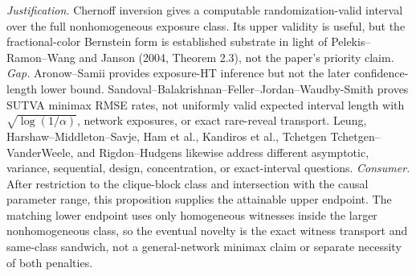 \documentclass{article}
\begin{document}
\par\smallskip\noindent \textit{Justification.} Chernoff inversion gives a computable randomization-valid interval over the full nonhomogeneous exposure class. Its upper validity is useful, but the fractional-color Bernstein form is established substrate in light of Pelekis--Ramon--Wang and Janson (2004, Theorem 2.3), not the paper's priority claim. \textit{Gap.} Aronow--Samii provides exposure-HT inference but not the later confidence-length lower bound. Sandoval--Balakrishnan--Feller--Jordan--Waudby-Smith proves SUTVA minimax RMSE rates, not uniformly valid expected interval length with \(\sqrt{\log(1/\alpha)}\), network exposures, or exact rare-reveal transport. Leung, Harshaw--Middleton--Savje, Ham et al., Kandiros et al., Tchetgen Tchetgen--VanderWeele, and Rigdon--Hudgens likewise address different asymptotic, variance, sequential, design, concentration, or exact-interval questions. \textit{Consumer.} After restriction to the clique-block class and intersection with the causal parameter range, this proposition supplies the attainable upper endpoint. The matching lower endpoint uses only homogeneous witnesses inside the larger nonhomogeneous class, so the eventual novelty is the exact witness transport and same-class sandwich, not a general-network minimax claim or separate necessity of both penalties.
\end{document}
